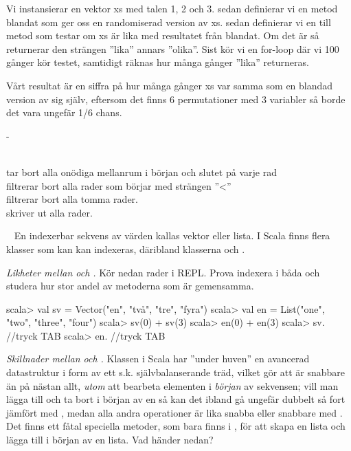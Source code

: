 {{\SOLUTION


\TaskSolved \what


\SubtaskSolved
Vi instansierar en vektor xs med talen 1, 2 och 3.
sedan definierar vi en metod blandat som ger oss en randomiserad version av xs.
sedan definierar vi en till metod som testar om xs är lika med resultatet från blandat. Om det är så returnerar den strängen ''lika'' annars ''olika''.
Sist kör vi en for-loop där vi 100 gånger kör testet, samtidigt räknas hur många gånger ''lika'' returneras.

Vårt resultat är en siffra på hur många gånger xs var samma som en blandad version av sig själv, eftersom det finns 6 permutationer med 3 variabler så borde det vara ungefär 1/6 chans.

\SubtaskSolved  -

\SubtaskSolved
\\  tar bort alla onödiga mellanrum i början och slutet på varje rad
\\  filtrerar bort alla rader som börjar med strängen ''<''
\\  filtrerar bort alla tomma rader.
\\  skriver ut alla rader.


\QUESTEND









\QUESTBEGIN

\Task  \what~  En indexerbar sekvens av värden kallas vektor eller lista. I Scala finns flera klasser som kan kan indexeras, däribland klasserna  och .

\Subtask \emph{Likheter mellan  och .} Kör nedan rader i REPL. Prova indexera i båda och studera hur stor andel av metoderna som är gemensamma.
\begin{REPL}
scala> val sv = Vector("en", "två", "tre", "fyra")
scala> val en = List("one", "two", "three", "four")
scala> sv(0) + sv(3)
scala> en(0) + en(3)
scala> sv. //tryck TAB
scala> en. //tryck TAB
\end{REPL}

\Subtask \emph{Skillnader mellan  och .} Klassen  i Scala har ''under huven'' en avancerad datastruktur i form av ett s.k. självbalanserande träd, vilket gör att  är snabbare än  på nästan allt, \emph{utom} att bearbeta elementen i \emph{början} av sekvensen; vill man lägga till och ta bort i början av en  så kan det ibland gå ungefär dubbelt så fort jämfört med , medan alla andra operationer är lika snabba eller snabbare med . Det finns ett fåtal speciella metoder, som bara finns i , för att skapa en lista och lägga till i början av en lista. Vad händer nedan?

}}
